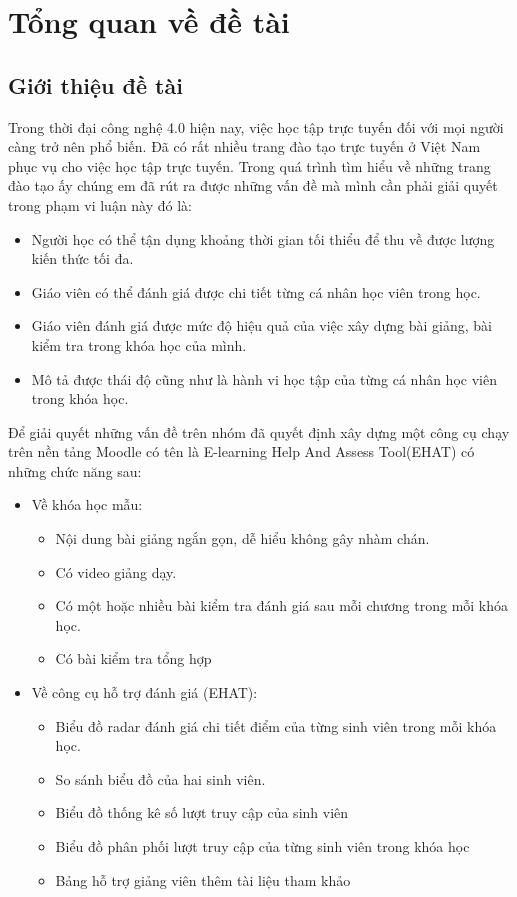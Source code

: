 \setcounter{chapter}{0}
\fontsize{13}{5}\selectfont
\chapter{Tổng quan về đề tài}
\section{Giới thiệu đề tài}
Trong thời đại công nghệ 4.0 hiện nay, việc học tập trực tuyến đối với mọi người càng trở nên phổ biến. Đã có rất nhiều trang đào tạo trực tuyến ở Việt Nam phục vụ cho việc học tập trực tuyến. Trong quá trình tìm hiểu về những trang đào tạo ấy chúng em đã rút ra được những vấn đề mà mình cần phải giải quyết trong phạm vi luận này đó là:

\begin{itemize}
	\item Người học có thể tận dụng khoảng thời gian tối thiểu để thu về được lượng kiến thức tối đa.
	\item Giáo viên có thể đánh giá được chi tiết từng cá nhân học viên trong học.
	\item Giáo viên đánh giá được mức độ hiệu quả của việc xây dựng bài giảng, bài kiểm tra trong khóa học của mình.
	\item Mô tả được thái độ cũng như là hành vi học tập của từng cá nhân học viên trong khóa học.
\end{itemize}

Để giải quyết những vấn đề trên nhóm đã quyết định xây dựng một công cụ chạy trên nền tảng Moodle có tên là E-learning Help And Assess Tool(EHAT) có những chức năng sau:

\begin{itemize}
	\item Về khóa học mẫu:
	\begin{itemize}
		\item Nội dung bài giảng ngắn gọn, dễ hiểu không gây nhàm chán.
		\item Có video giảng dạy.
		\item Có một hoặc nhiều bài kiểm tra đánh giá sau mỗi chương trong mỗi khóa học.
		\item Có bài kiểm tra tổng hợp
	\end{itemize}
	\item Về công cụ hỗ trợ đánh giá (EHAT):
	\begin{itemize}
		\item Biểu đồ radar đánh giá chi tiết điểm của từng sinh viên trong mỗi khóa học.
		\item So sánh biểu đồ của hai sinh viên.
		\item Biểu đồ thống kê số lượt truy cập của sinh viên
		\item Biểu đồ phân phối lượt truy cập của từng sinh viên trong khóa học
		\item Bảng hỗ trợ giảng viên thêm tài liệu tham khảo
	\end{itemize}
\end{itemize}

